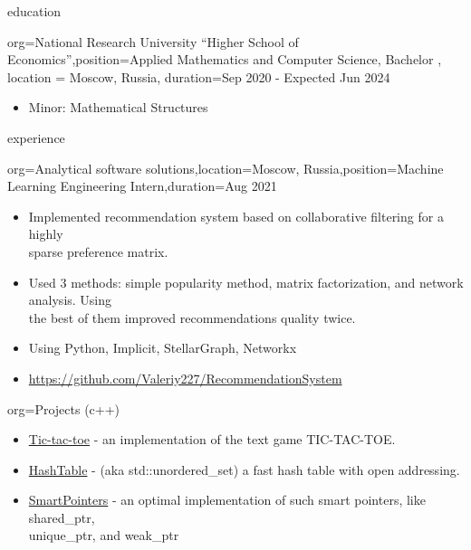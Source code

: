 \documentclass{resume}
\begin{document}
\makeheader

\begin{ResumeSection}{education}
    \begin{ResumeSubsection}{org={National Research University “Higher School of Economics”},position={Applied Mathematics and Computer Science, Bachelor
    }, location = {Moscow, Russia}, duration={Sep 2020 - Expected Jun 2024}}
        \begin{itemize}
            \item Minor: Mathematical Structures
        \end{itemize}
    \end{ResumeSubsection}
\end{ResumeSection}

\begin{ResumeSection}{experience}
    \begin{ResumeSubsection}{org=Analytical software solutions,location={Moscow, Russia},position={Machine Learning Engineering Intern},duration=Aug 2021}
        \begin{itemize}
            \item {Implemented recommendation system based on collaborative filtering for a highly\\ sparse preference matrix.}
            \item {Used 3 methods: simple popularity method, matrix factorization, and network analysis. Using\\ the best of them improved recommendations quality twice.}
            \item {Using Python, Implicit, StellarGraph, Networkx}
            \item {\href{https://github.com/Valeriy227/RecommendationSystem}{https://github.com/Valeriy227/RecommendationSystem}}
        \end{itemize}
    \end{ResumeSubsection}
    \begin{ResumeSubsection}{org=Projects (c++)}
        \begin{itemize}
            \item \href{https://github.com/Valeriy227/Tic-tac-toe}{Tic-tac-toe} - an implementation of the text game TIC-TAC-TOE.
            \item \href{https://github.com/Valeriy227/HashTable}{HashTable} - (aka std::unordered\_set) a fast hash table with open addressing.
            \item \href{https://github.com/Valeriy227/SmartPointers}{SmartPointers} - an optimal implementation of such smart pointers, like shared\_ptr,\\ unique\_ptr, and weak\_ptr
        \end{itemize}
    \end{ResumeSubsection}
\end{ResumeSection}
\end{document}
